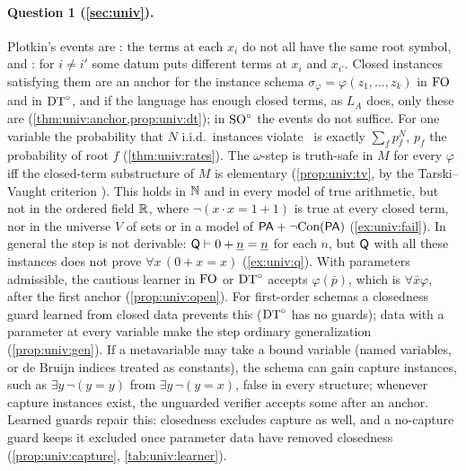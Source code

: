 \paragraph{Question 1 (\cref{sec:univ}).}
Plotkin's events are \evR: the terms at each $x_i$ do not all have the same root symbol, and \evD: for $i\neq i'$ some
datum puts different terms at $x_i$ and $x_{i'}$. Closed instances satisfying them are an anchor for the instance schema
$\sigma_\varphi=\varphi(z_1,\dots,z_k)$ in $\mathrm{FO}$ and in $\mathrm{DT}^{\circ}$, and if the language has enough closed terms, as $L_A$
does, only these are (\cref{thm:univ:anchor,prop:univ:dt}); in $\mathrm{SO}^{\circ}$ the events do not suffice. For one variable the
probability that $N$ i.i.d.\ instances violate \evR\ is exactly $\sum_fp_f^N$, $p_f$ the probability of root $f$
(\cref{thm:univ:rates}). The $\omega$-step is truth-safe in $M$ for every $\varphi$ iff the closed-term substructure of
$M$ is elementary (\cref{prop:univ:tv}, by the Tarski--Vaught criterion \citep{tarski1957arithmetical}). This holds in
$\mathbb{N}$ and in every model of true arithmetic, but not in the ordered field $\mathbb{R}$, where $\neg(x\cdot x=1+1)$ is true at
every closed term, nor in the universe $V$ of sets or in a model of $\mathsf{PA}+\neg\mathrm{Con}(\mathsf{PA})$ (\cref{ex:univ:fail}). In
general the step is not derivable: $\mathsf{Q}\vdash0+\underline{n}=\underline{n}$ for each $n$, but $\mathsf{Q}$ with all these instances does not
prove $\forall x\,(0+x=x)$ (\cref{ex:univ:q}). With parameters admissible, the cautious learner in $\mathrm{FO}$ or $\mathrm{DT}^{\circ}$
accepts $\varphi(\bar p)$, which is $\forall\bar x\varphi$, after the first anchor (\cref{prop:univ:open}). For
first-order schemas a closedness guard learned from closed data prevents this ($\mathrm{DT}^{\circ}$ has no guards); data with a
parameter at every variable make the step ordinary generalization (\cref{prop:univ:gen}). If a metavariable may take a
bound variable (named variables, or de Bruijn indices treated as constants), the schema can gain capture instances, such
as $\exists y\,\neg(y=y)$ from $\exists y\,\neg(y=x)$, false in every structure; whenever capture instances exist, the
unguarded verifier accepts some after an anchor. Learned guards repair this: closedness excludes capture as well, and a
no-capture guard keeps it excluded once parameter data have removed closedness (\cref{prop:univ:capture},
\cref{tab:univ:learner}).

